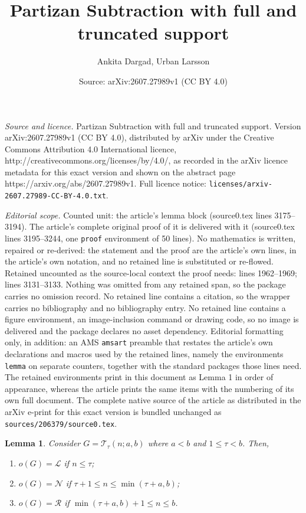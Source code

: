 \documentclass[10pt,a4paper]{amsart}
\title{Partizan Subtraction with full and truncated support}
\author{Ankita Dargad, Urban Larsson}
\date{Source: arXiv:2607.27989v1 (CC BY 4.0)}
\newtheorem{lemma}{Lemma}
\newcommand{\lp}{\mathscr{L}}
\newcommand{\np}{\mathscr{N}}
\newcommand{\rp}{\mathscr{R}}
\newcommand{\ts}{\mathcal{T}}
\begin{document}
\maketitle

\noindent\emph{Source and licence.} Partizan Subtraction with full and truncated support. Version arXiv:2607.27989v1 (CC BY 4.0), distributed by arXiv under the Creative Commons Attribution 4.0 International licence, http://creativecommons.org/licenses/by/4.0/, as recorded in the arXiv licence metadata for this exact version and shown on the abstract page https://arxiv.org/abs/2607.27989v1. Full licence notice: \texttt{licenses/arxiv-2607.27989-CC-BY-4.0.txt}.\par\smallskip

\noindent\textit{Editorial scope.} Counted unit: the article's lemma block (source0.tex lines 3175--3194). The article's complete original proof of it is delivered with it (source0.tex lines 3195--3244, one \texttt{proof} environment of 50 lines). No mathematics is written, repaired or re-derived: the statement and the proof are the article's own lines, in the article's own notation, and no retained line is substituted or re-flowed.  Retained uncounted as the source-local context the proof needs: lines 1962--1969; lines 3131--3133.  Nothing was omitted from any retained span, so the package carries no omission record.  No retained line contains a citation, so the wrapper carries no bibliography and no bibliography entry.  No retained line contains a figure environment, an image-inclusion command or drawing code, so no image is delivered and the package declares no asset dependency.  Editorial formatting only, in addition: an AMS \texttt{amsart} preamble that restates the article's own declarations and macros used by the retained lines, namely the environments \texttt{lemma} on separate counters, together with the standard packages those lines need.  The retained environments print in this document as Lemma 1 in order of appearance, whereas the article prints the same items with the numbering of its own full document.  The complete native source of the article as distributed in the arXiv e-print for this exact version is bundled unchanged as \texttt{sources/206379/source0.tex}.
\begin{lemma}\label{lem: outcome TS heap<=b}
    Consider $G=\ts_\tau(n;a,b)$ where $a<b$ and $1\le \tau<b$. Then, 
    \begin{enumerate}
        \item\label{item:lem: outcome TS heap<=b:1} $o(G)=\lp$ if $n\le \tau$;
        \item\label{item:lem: outcome TS heap<=b:2} $o(G)=\np$ if $\tau+1\le n\le \min(\tau+a,b)$;
        \item\label{item:lem: outcome TS heap<=b:3} $o(G)=\rp$ if $\min(\tau+a,b)+1\le n\le b$.
    \end{enumerate}
\end{lemma}
\end{document}
